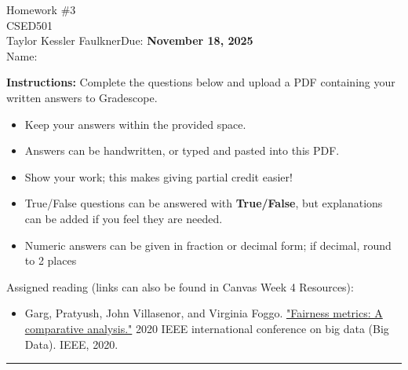 \documentclass[11pt]{article}
\newcommand{\Class}{CSED501}
\newcommand{\Instructor}{Taylor Kessler Faulkner}
\newcommand{\DueDate}{Due: \textbf{November 18, 2025}}
\newcommand{\HomeworkTitle}{Homework \#3}
\newcommand{\StudentName}{\underline{\hspace{5cm}} }
\begin{document}
\begin{center}
  {\LARGE \HomeworkTitle} \\
  \vspace{6pt}
  {\large \Class} \\
  \vspace{4pt}
  \Instructor \hfill \DueDate \\
  \vspace{8pt}
  Name: \StudentName
\end{center}

\textbf{Instructions:}
Complete the questions below and upload a PDF containing your written answers to Gradescope. 
\begin{itemize}
    \item Keep your answers within the provided space.
    \item Answers can be handwritten, or typed and pasted into this PDF. 
    \item Show your work; this makes giving partial credit easier!
    \item True/False questions can be answered with \textbf{True/False}, but explanations can be added if you feel they are needed.
    \item Numeric answers can be given in fraction or decimal form; if decimal, round to 2 places
\end{itemize}

Assigned reading (links can also be found in Canvas Week 4 Resources):
\begin{itemize}
\item Garg, Pratyush, John Villasenor, and Virginia Foggo. \href{https://ieeexplore.ieee.org/abstract/document/9378025?casa_token=TXxdmCHqBIsAAAAA:WL4mzBxwGeVUqa4FkRxZY7A1iAf0HYGAdOHGf3tV2c7VfRobp5bmFfDYXctc5mYWVeWACwTc}{"Fairness metrics: A comparative analysis."} 2020 IEEE international conference on big data (Big Data). IEEE, 2020.
\end{itemize}


\vspace{12pt}
\hrule
\vspace{12pt}

\newpage

\end{document}
